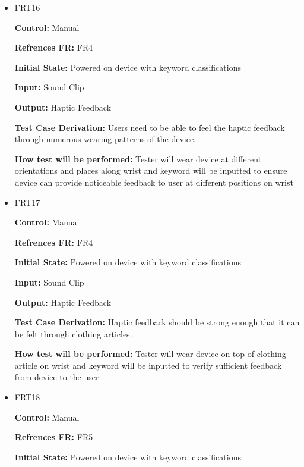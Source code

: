 \documentclass[12pt, titlepage]{article}
\begin{document}
\begin{itemize}

\item{FRT16}

\textbf{Control:} Manual

\textbf{Refrences FR:} FR4 					

\textbf{Initial State:} Powered on device with keyword classifications
					
\textbf{Input:} Sound Clip
					
\textbf{Output:} Haptic Feedback

\textbf{Test Case Derivation:} Users need to be able to feel the haptic feedback through numerous wearing patterns of the device.
					
\textbf{How test will be performed:} Tester will wear device at different orientations and places along wrist and keyword will be inputted to ensure device can provide noticeable feedback to user at different positions on wrist


\item{FRT17}

\textbf{Control:} Manual

\textbf{Refrences FR:} FR4 					

\textbf{Initial State:} Powered on device with keyword classifications
					
\textbf{Input:} Sound Clip
					
\textbf{Output:} Haptic Feedback

\textbf{Test Case Derivation:} Haptic feedback should be strong enough that it can be felt through clothing articles.
					
\textbf{How test will be performed:} Tester will wear device on top of clothing article on wrist and keyword will be inputted to verify sufficient feedback from device to the user


\item{FRT18}

\textbf{Control:} Manual 

\textbf{Refrences FR:} FR5 					

\textbf{Initial State:} Powered on device with keyword classifications
					

\end{itemize}
\end{document}
